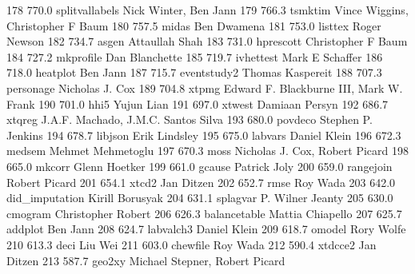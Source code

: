    178    770.0    splitvallabels  Nick Winter, Ben Jann                   
   179    766.3    tsmktim       Vince Wiggins, Christopher F Baum       
   180    757.5    midas         Ben Dwamena                             
   181    753.0    listtex       Roger Newson                            
   182    734.7    asgen         Attaullah Shah                          
   183    731.0    hprescott     Christopher F Baum                      
   184    727.2    mkprofile     Dan Blanchette                          
   185    719.7    ivhettest     Mark E Schaffer                         
   186    718.0    heatplot      Ben Jann                                
   187    715.7    eventstudy2   Thomas Kaspereit                        
   188    707.3    personage     Nicholas J. Cox                         
   189    704.8    xtpmg         Edward F. Blackburne III, Mark W. Frank 
   190    701.0    hhi5          Yujun Lian                              
   191    697.0    xtwest        Damiaan Persyn                          
   192    686.7    xtqreg        J.A.F. Machado, J.M.C. Santos Silva     
   193    680.0    povdeco       Stephen P. Jenkins                      
   194    678.7    libjson       Erik Lindsley                           
   195    675.0    labvars       Daniel Klein                            
   196    672.3    medsem        Mehmet Mehmetoglu                       
   197    670.3    moss          Nicholas J. Cox, Robert Picard          
   198    665.0    mkcorr        Glenn Hoetker                           
   199    661.0    gcause        Patrick Joly                            
   200    659.0    rangejoin     Robert Picard                           
   201    654.1    xtcd2         Jan Ditzen                              
   202    652.7    rmse          Roy Wada                                
   203    642.0    did_imputation  Kirill Borusyak                         
   204    631.1    splagvar      P. Wilner Jeanty                        
   205    630.0    cmogram       Christopher Robert                      
   206    626.3    balancetable  Mattia Chiapello                        
   207    625.7    addplot       Ben Jann                                
   208    624.7    labvalch3     Daniel Klein                            
   209    618.7    omodel        Rory Wolfe                              
   210    613.3    deci          Liu Wei                                 
   211    603.0    chewfile      Roy Wada                                
   212    590.4    xtdcce2       Jan Ditzen                              
   213    587.7    geo2xy        Michael Stepner, Robert Picard          
